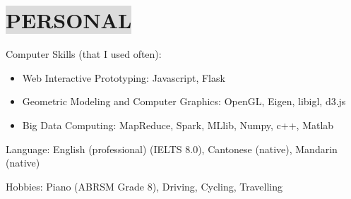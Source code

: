 \section*{
    \colorbox{gainsboro}{PERSONAL}
}

Computer Skills (that I used often):
\begin{itemize}[noitemsep,itemsep=0pt,topsep=0pt]
    \item Web Interactive Prototyping: Javascript, Flask
    \item Geometric Modeling and Computer Graphics: OpenGL, Eigen, libigl, d3.js
    \item Big Data Computing: MapReduce, Spark, MLlib, Numpy, c++, Matlab
\end{itemize}

Language: English (professional) (IELTS 8.0), Cantonese (native), Mandarin (native)

Hobbies: Piano (ABRSM Grade 8), Driving, Cycling, Travelling